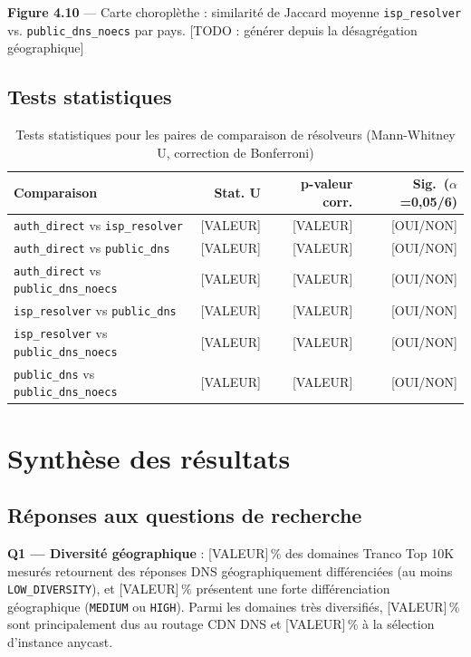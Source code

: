 \textbf{Figure 4.10} --- Carte choroplèthe : similarité de Jaccard moyenne \texttt{isp\_resolver} vs. \texttt{public\_dns\_noecs} par pays. [TODO : générer depuis la désagrégation géographique]

\subsection{Tests statistiques}
\label{subsec:4.5.4}

\begin{table}[H]
\centering
\small
\begin{tabularx}{\linewidth}{X r r r}
\toprule
\textbf{Comparaison} & \textbf{Stat. U} & \textbf{p-valeur corr.} & \textbf{Sig.\ ($\alpha$=0,05/6)} \\
\midrule
\texttt{auth\_direct} vs \texttt{isp\_resolver} & [VALEUR] & [VALEUR] & [OUI/NON] \\
\texttt{auth\_direct} vs \texttt{public\_dns} & [VALEUR] & [VALEUR] & [OUI/NON] \\
\texttt{auth\_direct} vs \texttt{public\_dns\_noecs} & [VALEUR] & [VALEUR] & [OUI/NON] \\
\texttt{isp\_resolver} vs \texttt{public\_dns} & [VALEUR] & [VALEUR] & [OUI/NON] \\
\texttt{isp\_resolver} vs \texttt{public\_dns\_noecs} & [VALEUR] & [VALEUR] & [OUI/NON] \\
\texttt{public\_dns} vs \texttt{public\_dns\_noecs} & [VALEUR] & [VALEUR] & [OUI/NON] \\
\bottomrule
\end{tabularx}
\caption{Tests statistiques pour les paires de comparaison de résolveurs (Mann-Whitney U, correction de Bonferroni)}
\label{tab:statistical_tests}
\end{table}

\bigskip
\section{Synthèse des résultats}
\label{sec:4.6}

\subsection{Réponses aux questions de recherche}
\label{subsec:4.6.1}

\textbf{Q1 --- Diversité géographique} : [VALEUR]\,\% des domaines Tranco Top 10K mesurés retournent des réponses DNS géographiquement différenciées (au moins \texttt{LOW\_DIVERSITY}), et [VALEUR]\,\% présentent une forte différenciation géographique (\texttt{MEDIUM} ou \texttt{HIGH}). Parmi les domaines très diversifiés, [VALEUR]\,\% sont principalement dus au routage CDN DNS et [VALEUR]\,\% à la sélection d'instance anycast.

